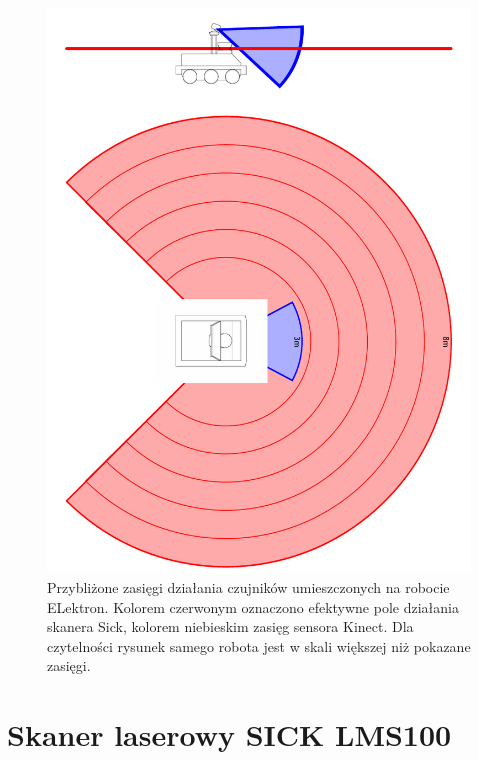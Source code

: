 \begin{figure}[htp!]
\centering
\includegraphics{../../Common/img/elektron/range}
\caption[Przybliżone zasięgi działania czujników umieszczonych na robocie
ELektron]{Przybliżone zasięgi działania czujników umieszczonych na robocie
ELektron. Kolorem czerwonym oznaczono efektywne pole działania skanera Sick,
kolorem niebieskim zasięg sensora Kinect. Dla czytelności rysunek samego robota
jest w skali większej niż pokazane zasięgi.}
\label{fig:range}
\end{figure}



\section{Skaner laserowy SICK LMS100}

